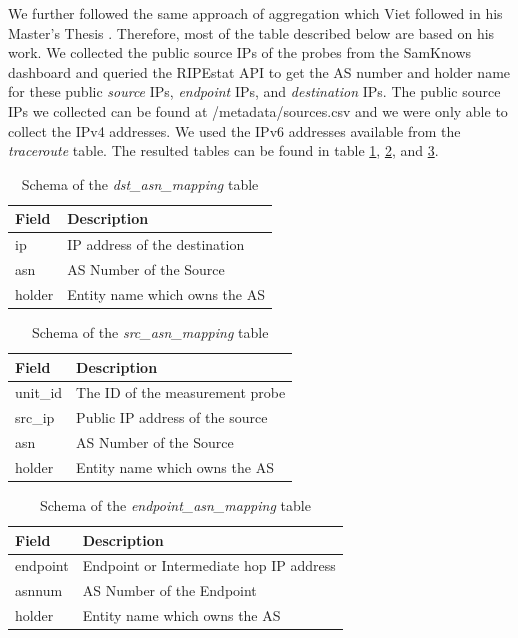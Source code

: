 \FloatBarrier

We further followed the same approach of aggregation which Viet followed in his Master's Thesis \cite{viet}. Therefore, most of the table described below are based on his work. 
We collected the public source IPs of the probes from the SamKnows \cite{samknows} dashboard and queried the RIPEstat \cite{ripestat} API to get the AS number and holder name for these public \textit{source} IPs, \textit{endpoint} IPs, and \textit{destination} IPs. The public source IPs we collected can be found at /metadata/sources.csv and we were only able to collect the IPv4 addresses. We used the IPv6 addresses available from the \textit{traceroute} table. The resulted tables can be found in table \cref{table:destination}, \cref{table:source}, and \cref{table:endpoint}. 

\begin{table}[!h]
	\centering
	\caption{Schema of the \textit{dst\_asn\_mapping} table}
	\label{table:destination}
	\begin{tabular}{lp{7cm}}
  		\toprule
  		\textbf{Field} & \textbf{Description} \\ 
  		\midrule
  		ip & IP address of the destination \\
  		asn & AS Number of the Source \\
  		holder & Entity name which owns the AS \\
  		\bottomrule
\end{tabular}
\end{table}

\begin{table}[!h]
	\centering
	\caption{Schema of the \textit{src\_asn\_mapping} table}
	\label{table:source}
	\begin{tabular}{lp{7cm}}
  		\toprule
  		\textbf{Field} & \textbf{Description} \\ 
  		\midrule
  		unit\_id & The ID of the measurement probe \\
  		src\_ip & Public IP address of the source \\
  		asn & AS Number of the Source \\
  		holder & Entity name which owns the AS \\
  		\bottomrule
\end{tabular}
\end{table}

\begin{table}[!h]
	\centering
	\caption{Schema of the \textit{endpoint\_asn\_mapping} table}
	\label{table:endpoint}
	\begin{tabular}{lp{7cm}}
  		\toprule
  		\textbf{Field} & \textbf{Description} \\ 
  		\midrule
  		endpoint & Endpoint or Intermediate hop IP address \\
  		asnnum & AS Number of the Endpoint \\
  		holder & Entity name which owns the AS \\
  		\bottomrule
\end{tabular}
\end{table}

